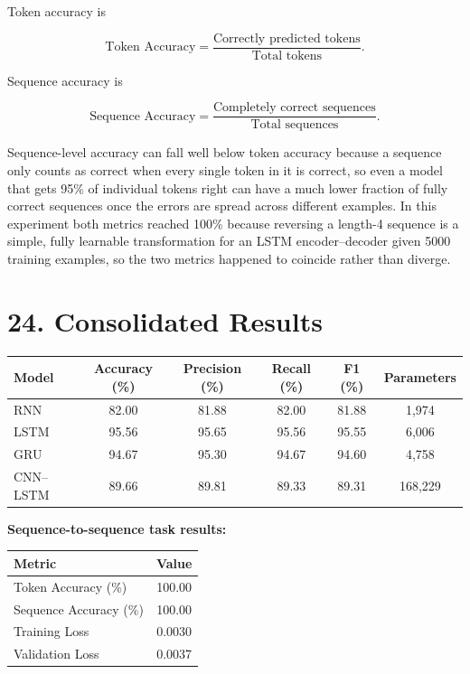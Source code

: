 \documentclass[10pt]{article}
\begin{document}
Token accuracy is

\[
\text{Token Accuracy}
=
\frac{\text{Correctly predicted tokens}}
{\text{Total tokens}}.
\]

Sequence accuracy is

\[
\text{Sequence Accuracy}
=
\frac{\text{Completely correct sequences}}
{\text{Total sequences}}.
\]

Sequence-level accuracy can fall well below token accuracy because a
sequence only counts as correct when every single token in it is correct,
so even a model that gets 95\% of individual tokens right can have a much
lower fraction of fully correct sequences once the errors are spread across
different examples. In this experiment both metrics reached 100\% because
reversing a length-4 sequence is a simple, fully learnable transformation
for an LSTM encoder--decoder given 5000 training examples, so the two
metrics happened to coincide rather than diverge.

\section*{24. Consolidated Results}

\begin{center}
\begin{tabular}{|l|c|c|c|c|c|}
\hline
Model & Accuracy (\%) & Precision (\%) & Recall (\%) & F1 (\%) & Parameters\\
\hline
RNN & 82.00 & 81.88 & 82.00 & 81.88 & 1{,}974\\
LSTM & 95.56 & 95.65 & 95.56 & 95.55 & 6{,}006\\
GRU & 94.67 & 95.30 & 94.67 & 94.60 & 4{,}758\\
CNN--LSTM & 89.66 & 89.81 & 89.33 & 89.31 & 168{,}229\\
\hline
\end{tabular}
\end{center}

\textbf{Sequence-to-sequence task results:}

\begin{center}
\begin{tabular}{|l|c|}
\hline
Metric & Value\\
\hline
Token Accuracy (\%) & 100.00\\
Sequence Accuracy (\%) & 100.00\\
Training Loss & 0.0030\\
Validation Loss & 0.0037\\
\hline
\end{tabular}
\end{center}
\end{document}
